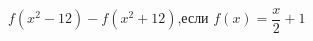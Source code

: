 \begin{ex}[type=calculate_expression]
	\begin{condition}
		\( f(x^2-12)-f(x^2+12) \),\quad если \( f(x)=\dfrac{x}{2}+1 \)
	\end{condition}
\end{ex}